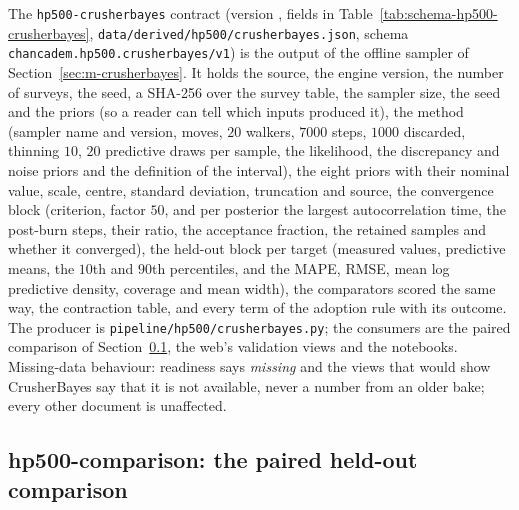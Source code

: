 The \texttt{hp500-crusherbayes} contract (version , fields in Table~\ref{tab:schema-hp500-crusherbayes}, \texttt{data/\allowbreak{}derived/\allowbreak{}hp500/\allowbreak{}crusherbayes.json}, schema
\texttt{chancadem.hp500.crusherbayes/\allowbreak{}v1}) is the output of the offline sampler of Section~\ref{sec:m-crusherbayes}. It holds the
source, the engine version, the number of surveys, the seed, a SHA-256 over the survey table, the sampler size, the seed and the
priors (so a reader can tell which inputs produced it), the method (sampler name and version, moves, $20$ walkers, $7000$
steps, $1000$ discarded, thinning $10$, $20$ predictive draws per sample, the likelihood, the discrepancy and noise priors and the
definition of the interval), the eight priors with their nominal value, scale, centre, standard deviation, truncation and source,
the convergence block (criterion, factor $50$, and per posterior the largest autocorrelation time, the post-burn steps, their
ratio, the acceptance fraction, the retained samples and whether it converged), the held-out block per target (measured values,
predictive means, the $10$th and $90$th percentiles, and the MAPE, RMSE, mean log predictive density, coverage and mean width),
the comparators scored the same way, the contraction table, and every term of the adoption rule with its outcome. The producer is
\texttt{pipeline/\allowbreak{}hp500/\allowbreak{}crusherbayes.py}; the consumers are the paired comparison of Section~\ref{sec:data-comparison}, the web's validation views and the notebooks. Missing-data behaviour:
readiness says \emph{missing} and the views that would show CrusherBayes say that it is not available, never a number from an
older bake; every other document is unaffected.

\subsection{hp500-comparison: the paired held-out comparison}\label{sec:data-comparison}

